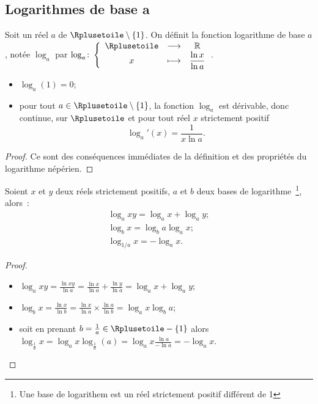 \subsection{Logarithmes de base a}
\label{subsec:chap1-loga}
\begin{defdef}
  Soit un réel $a$ de $\Rplusetoile\setminus\{1\}$. On définit la fonction logarithme de base  $a$, notée $\log_a$ par $\fonction{\log_a}{\Rplusetoile}{\R}{x}{\dfrac{\ln x}{\ln a}}$.
\end{defdef}
%
\begin{prop}
  \begin{itemize}
  \item $\log_a(1)=0$;
  \item pour tout $a \in\Rplusetoile\setminus\{1\}$, la fonction $\log_a$ est dérivable, donc continue, sur $\Rplusetoile$ et pour tout réel $x$ strictement positif
    \begin{equation}
      \log_a'(x)=\frac{1}{x \ln a}.
    \end{equation}
  \end{itemize}
\end{prop}
\begin{proof}
  Ce sont des conséquences immédiates de la définition et des propriétés du logarithme népérien.
\end{proof}
%
\begin{prop} 
  Soient $x$ et $y$ deux réels strictement positifs, $a$ et $b$ deux bases de logarithme~\footnote{Une base de logarithem est un réel strictement positif différent de 1}, alors~:
  \begin{gather}
    \log_a xy=\log_a x + \log_a y; \\
    \log_b x=\log_ba \log_ax; \\
    \log_{1/a} x=-\log_a x.
  \end{gather}
\end{prop}
\begin{proof}
  \begin{itemize}
  \item $\log_a xy= \frac{\ln xy}{\ln a}= \frac{\ln x}{\ln a} +\frac{\ln y}{\ln a}=\log_ax+\log_ay$;
  \item $\log_b x = \frac{\ln x}{\ln b}=\frac{\ln x}{\ln a} \times \frac{\ln a}{\ln b}=\log_ax \log_ba$;
  \item soit en prenant $b=\frac{1}{a} \in \Rplusetoile-\{1\}$ alors $\log_{\frac{1}{a}}x=\log_ax \log_{\frac{1}{a}}(a)=\log_ax \frac{\ln a}{-\ln a}=-\log_ax$.
  \end{itemize}
\end{proof}
